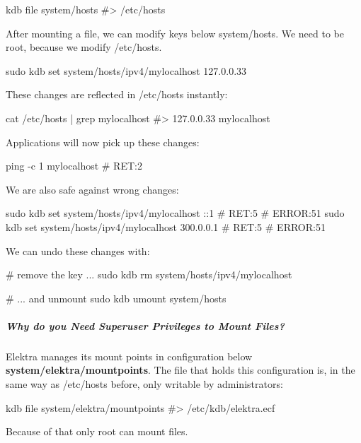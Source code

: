 \begin{DoxyCode}
kdb file system/hosts
#> /etc/hosts
\end{DoxyCode}


After mounting a file, we can modify keys below {\ttfamily system/hosts}. We need to be root, because we modify {\ttfamily /etc/hosts}.


\begin{DoxyCode}
sudo kdb set system/hosts/ipv4/mylocalhost 127.0.0.33
\end{DoxyCode}


These changes are reflected in {\ttfamily /etc/hosts} instantly\+:


\begin{DoxyCode}
cat /etc/hosts | grep mylocalhost
#> 127.0.0.33   mylocalhost
\end{DoxyCode}


Applications will now pick up these changes\+:


\begin{DoxyCode}
ping -c 1 mylocalhost
# RET:2
\end{DoxyCode}


We are also safe against wrong changes\+:


\begin{DoxyCode}
sudo kdb set system/hosts/ipv4/mylocalhost ::1
# RET:5
# ERROR:51
sudo kdb set system/hosts/ipv4/mylocalhost 300.0.0.1
# RET:5
# ERROR:51
\end{DoxyCode}


We can undo these changes with\+:


\begin{DoxyCode}
# remove the key ...
sudo kdb rm system/hosts/ipv4/mylocalhost

# ... and unmount
sudo kdb umount system/hosts
\end{DoxyCode}


\subparagraph*{Why do you Need Superuser Privileges to Mount Files?}

Elektra manages its mount points in configuration below {\bfseries system/elektra/mountpoints}. The file that holds this configuration is, in the same way as {\ttfamily /etc/hosts} before, only writable by administrators\+:


\begin{DoxyCode}
kdb file system/elektra/mountpoints
#> /etc/kdb/elektra.ecf
\end{DoxyCode}


Because of that only root can mount files.

